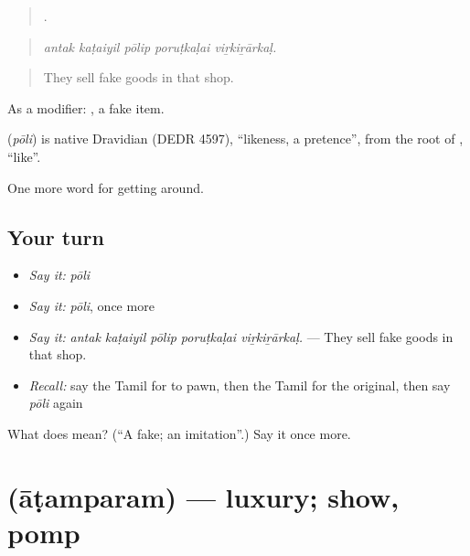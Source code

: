 \begin{quote}
    .
\end{quote}

\begin{quote}
\emph{antak kaṭaiyil pōlip poruṭkaḷai viṟkiṟārkaḷ.}
\end{quote}

\begin{quote}
They sell fake goods in that shop.
\end{quote}

As a modifier:  , a fake item.

\begin{cousinweb}
\textbf{} (\emph{pōli}) is native Dravidian (DEDR 4597), \textquotedblleft{}likeness, a pretence\textquotedblright{}, from the root of , \textquotedblleft{}like\textquotedblright{}.
\end{cousinweb}

\begin{grammarlens}[title={What you've built}]
One more word for getting around.
\end{grammarlens}

\subsection*{Your turn}
\begin{itemize}
\raggedright
  \item \emph{Say it:} \emph{pōli}
  \item \emph{Say it:} \emph{pōli}, once more
  \item \emph{Say it:} \emph{antak kaṭaiyil pōlip poruṭkaḷai viṟkiṟārkaḷ.} — They sell fake goods in that shop.
  \item \emph{Recall:} say the Tamil for to pawn, then the Tamil for the original, then say \emph{pōli} again
\end{itemize}

\begin{tcolorbox}[breakable,colback=teal!4,colframe=teal!35!black,title={Before you move on}]
What does  mean? (\textquotedblleft{}A fake; an imitation\textquotedblright{}.) Say it once more.
\end{tcolorbox}
\section[\texorpdfstring{\ta{ஆடம்பரம்} (āṭamparam)}{ஆடம்பரம் (āṭamparam)}]{ (āṭamparam) — luxury; show, pomp}

